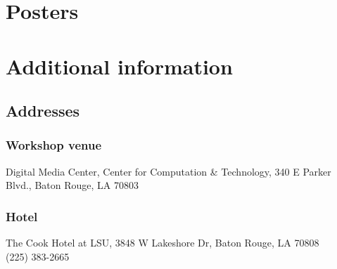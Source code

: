 \documentclass[12pt,letterpaper]{book}
\newenvironment{conf-abstract}[4][]{
 \needspace{10\baselineskip}
 \begin{center}
 { \renewcommand\textsuperscript[1]{}
 \phantomsection\addcontentsline{toc}{section}
 {\texorpdfstring{#2 (\emph{#3})}{#2 (#3)}}
 }
 {{\large\bfseries #2}\marginnote{#1}\par}
 \medskip
 {#3\par}
 \smallskip
 {\small #4\par}
 \end{center}
}{%
 \bigskip
 \hrule
 \bigskip
}
\newcommand{\indexauthors}[1]{%
 \forcsvlist{\index}{#1}
}
\begin{document}
\chapter{Posters}

{
\def\x{\last}
\def\y{\substring{\x}{1}{1}\par}
\begin{conf-abstract}[\datum\\\time]
{\title}
{\first~\last}
{\affiliation}
\indexauthors{\last~\first}
\begin{center}

\end{center}
\end{conf-abstract}
}


%

%
%
%

\chapter{Additional information}

\section{Addresses}

\subsection*{Workshop venue}
Digital Media Center, Center for Computation \& Technology, 340 E Parker Blvd., Baton Rouge, LA 70803
\subsection*{Hotel}
The Cook Hotel at LSU, 3848 W Lakeshore Dr, Baton Rouge, LA 70808 \\
(225) 383-2665
\end{document}
